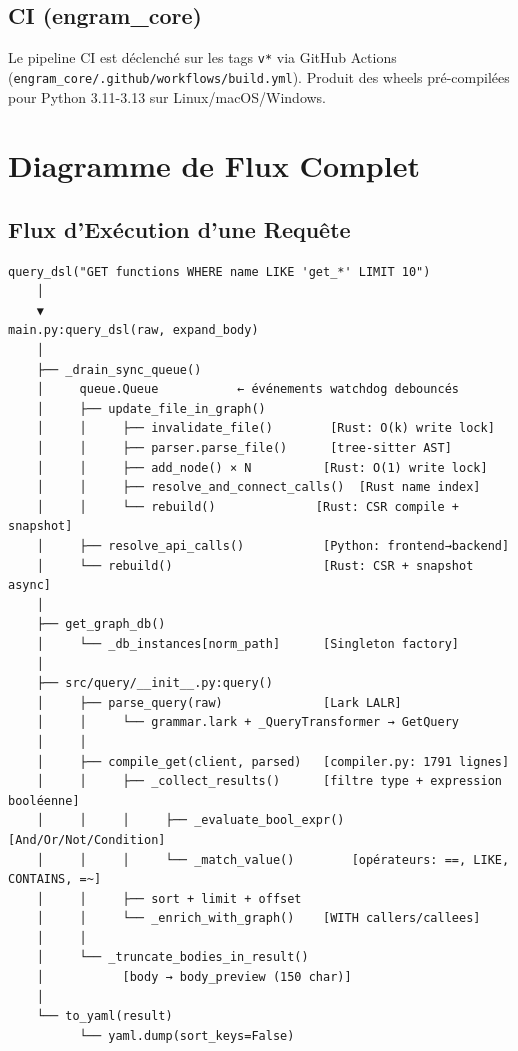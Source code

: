 \documentclass[12pt,a4paper]{article}
\newcommand{\code}[1]{\texttt{#1}}
\begin{document}
\subsection{CI (engram\_core)}

Le pipeline CI est déclenché sur les tags \code{v*} via GitHub Actions (\code{engram\_core/.github/workflows/build.yml}). Produit des wheels pré-compilées pour Python 3.11-3.13 sur Linux/macOS/Windows.

\section{Diagramme de Flux Complet}

\subsection{Flux d'Exécution d'une Requête}

\begin{lstlisting}[basicstyle=\ttfamily\scriptsize]
query_dsl("GET functions WHERE name LIKE 'get_*' LIMIT 10")
    │
    ▼
main.py:query_dsl(raw, expand_body)
    │
    ├── _drain_sync_queue()
    │     queue.Queue           ← événements watchdog debouncés
    │     ├── update_file_in_graph()
    │     │     ├── invalidate_file()        [Rust: O(k) write lock]
    │     │     ├── parser.parse_file()      [tree-sitter AST]
    │     │     ├── add_node() × N          [Rust: O(1) write lock]
    │     │     ├── resolve_and_connect_calls()  [Rust name index]
    │     │     └── rebuild()              [Rust: CSR compile + snapshot]
    │     ├── resolve_api_calls()           [Python: frontend→backend]
    │     └── rebuild()                     [Rust: CSR + snapshot async]
    │
    ├── get_graph_db()
    │     └── _db_instances[norm_path]      [Singleton factory]
    │
    ├── src/query/__init__.py:query()
    │     ├── parse_query(raw)              [Lark LALR]
    │     │     └── grammar.lark + _QueryTransformer → GetQuery
    │     │
    │     ├── compile_get(client, parsed)   [compiler.py: 1791 lignes]
    │     │     ├── _collect_results()      [filtre type + expression booléenne]
    │     │     │     ├── _evaluate_bool_expr()  [And/Or/Not/Condition]
    │     │     │     └── _match_value()        [opérateurs: ==, LIKE, CONTAINS, =~]
    │     │     ├── sort + limit + offset
    │     │     └── _enrich_with_graph()    [WITH callers/callees]
    │     │
    │     └── _truncate_bodies_in_result()
    │           [body → body_preview (150 char)]
    │
    └── to_yaml(result)
          └── yaml.dump(sort_keys=False)
\end{lstlisting}
\end{document}
